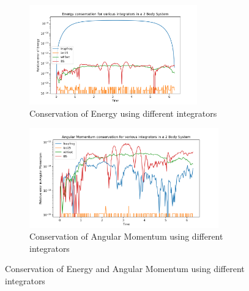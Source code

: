 \documentclass[12pt,a4paper]{article}
\begin{document}
\begin{figure}[H]
  \centering
  \begin{subfigure}{0.49\textwidth}
    \includegraphics[height = 1.7in]{2Body/2Body_Energy_Consv_int.png}
    \caption{Conservation of Energy using different integrators}
    \label{fig:int_e}  
  \end{subfigure}
  \begin{subfigure}{0.49\textwidth}
    \includegraphics[height = 1.7in]{2Body/2Body_L_Consv_int.png}
    \caption{Conservation of Angular Momentum using different integrators}
    \label{fig:int_L}  
  \end{subfigure}
  \caption{Conservation of Energy and Angular Momentum using different integrators}
  \label{fig:int:4}
\end{figure}
\end{document}
